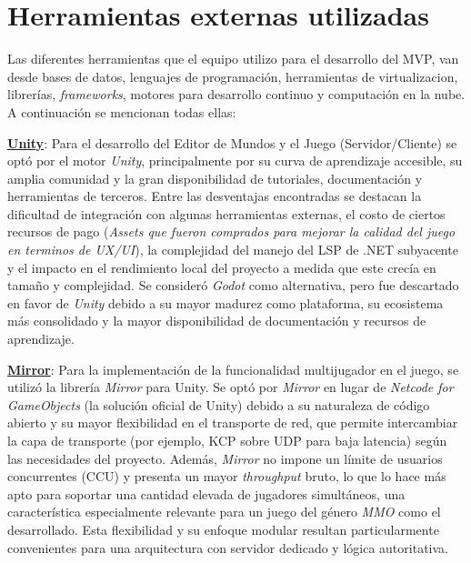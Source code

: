 \section{Herramientas externas utilizadas}

Las diferentes herramientas que el equipo utilizo para el desarrollo del MVP, van desde bases de datos, lenguajes de programación, 
herramientas de virtualizacion, librerías, \textit{frameworks}, motores para desarrollo continuo y computación en la nube. 
A continuación se mencionan todas ellas:
\vspace{0.25cm}

\textbf{\underline{Unity}}: Para el desarrollo del Editor de Mundos y el Juego (Servidor/Cliente) se optó 
por el motor \textit{Unity}, principalmente por su curva de aprendizaje accesible, 
su amplia comunidad y la gran disponibilidad de tutoriales, documentación y herramientas de terceros. Entre 
las desventajas encontradas se destacan la dificultad de integración con algunas herramientas externas, el 
costo de ciertos recursos de pago (\textit{Assets que fueron comprados para mejorar la calidad del juego en terminos de UX/UI}), 
la complejidad del manejo del LSP de .NET subyacente y el impacto en el rendimiento local del proyecto a medida que este crecía en tamaño y complejidad.
Se consideró \textit{Godot} como alternativa, pero fue descartado en favor de \textit{Unity} debido a su 
mayor madurez como plataforma, su ecosistema más consolidado y la mayor disponibilidad de documentación 
y recursos de aprendizaje.

\vspace{0.25cm}

\textbf{\underline{Mirror}}: Para la implementación de la funcionalidad multijugador en el juego, 
se utilizó la librería \textit{Mirror} para Unity. Se optó por \textit{Mirror} en lugar de 
\textit{Netcode for GameObjects} (la solución oficial de Unity) debido a su naturaleza de código abierto 
y su mayor flexibilidad en el transporte de red, que permite intercambiar la capa de transporte (por ejemplo, KCP sobre UDP para baja latencia) 
según las necesidades del proyecto. Además, \textit{Mirror} no impone un límite de usuarios concurrentes (CCU) y presenta un mayor 
\textit{throughput} bruto, lo que lo hace más apto para soportar una cantidad elevada de jugadores 
simultáneos, una característica especialmente relevante para un juego del género \textit{MMO} como el desarrollado. 
Esta flexibilidad y su enfoque modular resultan particularmente convenientes para una arquitectura con 
servidor dedicado y lógica autoritativa.

